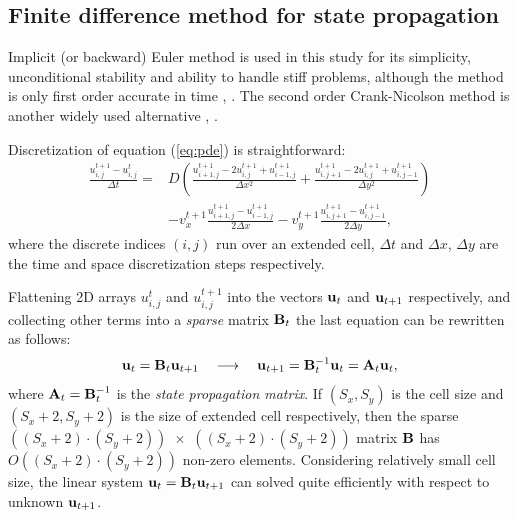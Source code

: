 \documentclass[acmsmall,review,anonymous]{acmart}\settopmatter{printfolios=true,printccs=false,printacmref=false}
\begin{document}
\subsection{Finite difference method for state propagation\label{sec:finit-diff}}

Implicit (or backward) Euler method is used in this study for its simplicity, unconditional stability and ability to handle stiff problems, although the method is only first order accurate in time \cite{Sauer11}, \cite{Butcher03}. The second order Crank-Nicolson method is another widely used alternative \cite{Crank47}, \cite{Thomas95}.

\newcommand{\myu}[3]{u_{{#1},{#2}}^{#3}}
Discretization of equation (\ref{eq:pde}) is straightforward: 
\begin{equation}
\begin{aligned}
\frac{\myu{i}{j}{t+1} - \myu{i}{j}{t}}{\Delta t} = {} &
D \left(
\frac{\myu{i+1}{j}{t+1} - 2\myu{i}{j}{t+1} + \myu{i-1}{j}{t+1}}{\Delta{x}^2} +
\frac{\myu{i}{j+1}{t+1} - 2\myu{i}{j}{t+1} + \myu{i}{j-1}{t+1}}{\Delta{y}^2}
\right) \\
&
-v_x^{t+1} \frac{\myu{i+1}{j}{t+1} - \myu{i-1}{j}{t+1}}{2\Delta{x}} 
-v_y^{t+1} \frac{\myu{i}{j+1}{t+1} - \myu{i}{j-1}{t+1}}{2\Delta{y}},
\end{aligned}
\label{eq:discrete-pde}
\end{equation}
where the discrete indices $(i,j)$ run over an extended cell, $\Delta{t}$ and $\Delta{x}$, $\Delta{y}$ are the time and space discretization steps respectively.

Flattening 2D arrays $\myu{i}{j}{t}$ and $\myu{i}{j}{t+1}$ into the vectors ${\bf u}_{t}$ and ${\bf u}_{t+1}$ respectively, and collecting other terms into a \textit{sparse} matrix ${\bf B}_t$ the last equation can be rewritten as follows:
\begin{equation}
{\bf u}_{t} = {\bf B}_t {\bf u}_{t+1} \quad \longrightarrow \quad
{\bf u}_{t+1} = {\bf B}^{-1}_t {\bf u}_{t} = {\bf A}_t {\bf u}_{t},
\label{eq:state-propag}
\end{equation}
where ${\bf A}_t = {\bf B}^{-1}_t$ is the \textit{state propagation matrix}. If $(S_x,S_y)$ is the cell size and $(S_x\!+\!2,S_y\!+\!2)$ is the size of extended cell respectively, then the sparse $((S_x\!+\!2)\!\cdot\!(S_y\!+\!2))\,\,{\times}\,\,((S_x\!+\!2)\!\cdot\!(S_y\!+\!2))$ matrix ${\bf B}$ has $O((S_x\!+\!2)\!\cdot\!(S_y\!+\!2))$ non-zero elements. Considering relatively small cell size, the linear system ${\bf u}_{t} = {\bf B}_t {\bf u}_{t+1}$ can solved quite efficiently with respect to unknown ${\bf u}_{t+1}$.
\end{document}

